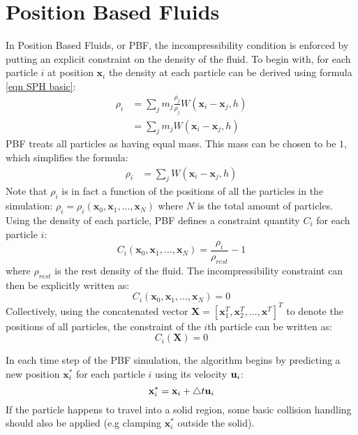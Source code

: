 \section{Position Based Fluids}
In Position Based Fluids, or PBF, the incompressibility condition is enforced by putting an explicit constraint on the density of the fluid. To begin with, for each particle $i$ at position $\textbf{x}_i$ the density at each particle can be derived using formula \ref{eqn SPH basic}:
\begin{equation*}
    \begin{aligned}
        \rho_i &= \sum_{j} m_j \frac{\rho_j}{\rho_j} W(\textbf{x}_i-\textbf{x}_j,h)\\
        &= \sum_{j} m_j W(\textbf{x}_i-\textbf{x}_j,h)
    \end{aligned}
\end{equation*}
PBF treats all particles as having equal mass. This mass can be chosen to be $1$, which simplifies the formula:
\begin{equation}
    \label{eqn PBF rho}
    \begin{aligned}
        \rho_i 
        &= \sum_{j} W(\textbf{x}_i-\textbf{x}_j,h)
    \end{aligned}
\end{equation}
Note that $\rho_i$ is in fact a function of the positions of all the particles in the simulation: $\rho_i = \rho_i(\textbf{x}_0,\textbf{x}_1,\dots,\textbf{x}_N)$ where $N$ is the total amount of particles. Using the density of each particle, PBF defines a constraint quantity $C_i$ for each particle $i$:
$$
C_i(\textbf{x}_0,\textbf{x}_1,\dots,\textbf{x}_N) = \frac{\rho_i}{\rho_{rest}} - 1
$$
where $\rho_{rest}$ is the rest density of the fluid. The incompressibility constraint can then be explicitly written as:
$$
C_i(\textbf{x}_0,\textbf{x}_1,\dots,\textbf{x}_N) = 0
$$
Collectively, using the concatenated vector $\textbf{X} = [\textbf{x}_1^T,\textbf{x}_2^T,\dots,\textbf{x}^T]^T$ to denote the positions of all particles, the constraint of the $i$th particle can be written as:
\begin{equation}
    C_i(\textbf{X}) = 0
\end{equation}

In each time step of the PBF simulation, the algorithm begins by predicting a new position $\textbf{x}_i^*$ for each particle $i$ using its velocity $\textbf{u}_i$:
$$
\textbf{x}_i^* = \textbf{x}_i + \triangle t \textbf{u}_i
$$
If the particle happens to travel into a solid region, some basic collision handling should also be applied (e.g clamping $\textbf{x}_i^*$ outside the solid).

